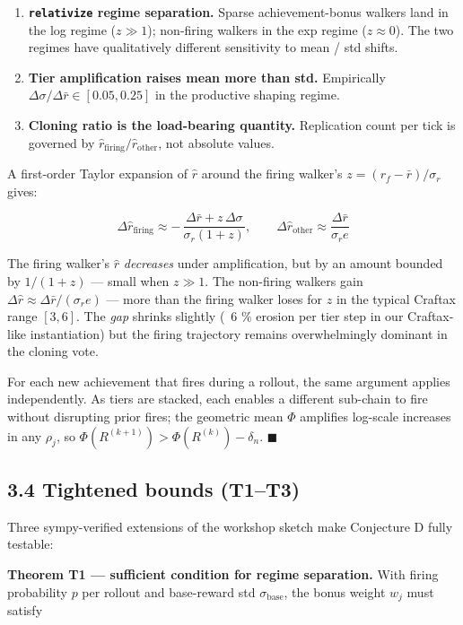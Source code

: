\begin{enumerate}
\item \textbf{\texttt{relativize} regime separation.} Sparse achievement-bonus walkers land in the log regime ($z \gg 1$); non-firing walkers in the exp regime ($z \approx 0$). The two regimes have qualitatively different sensitivity to mean / std shifts.
\item \textbf{Tier amplification raises mean more than std.} Empirically $\Delta\sigma / \Delta\bar r \in [0.05, 0.25]$ in the productive shaping regime.
\item \textbf{Cloning ratio is the load-bearing quantity.} Replication count per tick is governed by $\widehat{r}_{\text{firing}} / \widehat{r}_{\text{other}}$, not absolute values.
\end{enumerate}
A first-order Taylor expansion of $\widehat{r}$ around the firing
walker's $z = (r_f - \bar r)/\sigma_r$ gives:

\[
\Delta \widehat{r}_{\text{firing}} \approx -\,\frac{\Delta\bar r + z\,\Delta\sigma}{\sigma_r(1+z)}, \qquad
\Delta \widehat{r}_{\text{other}} \approx \frac{\Delta\bar r}{\sigma_r e}
\]

The firing walker's $\widehat{r}$ \emph{decreases} under amplification, but
by an amount bounded by $1/(1+z)$ — small when $z \gg 1$. The
non-firing walkers gain $\Delta\widehat{r} \approx \Delta\bar r / (\sigma_r e)$
— more than the firing walker loses for $z$ in the typical Craftax
range $[3, 6]$. The \emph{gap} shrinks slightly (~6 \% erosion per tier
step in our Craftax-like instantiation) but the firing trajectory
remains overwhelmingly dominant in the cloning vote.

For each new achievement that fires during a rollout, the same
argument applies independently. As tiers are stacked, each enables a
different sub-chain to fire without disrupting prior fires; the
geometric mean $\Phi$ amplifies log-scale increases in any $\rho_j$,
so $\Phi(R^{(k+1)}) > \Phi(R^{(k)}) - \delta_n$. $\blacksquare$

\subsection{3.4 Tightened bounds (T1–T3)}

Three sympy-verified extensions of the workshop sketch make
Conjecture D fully testable:

\textbf{Theorem T1 — sufficient condition for regime separation.} With
firing probability $p$ per rollout and base-reward std $\sigma_{\text{base}}$, the bonus weight $w_j$ must satisfy

